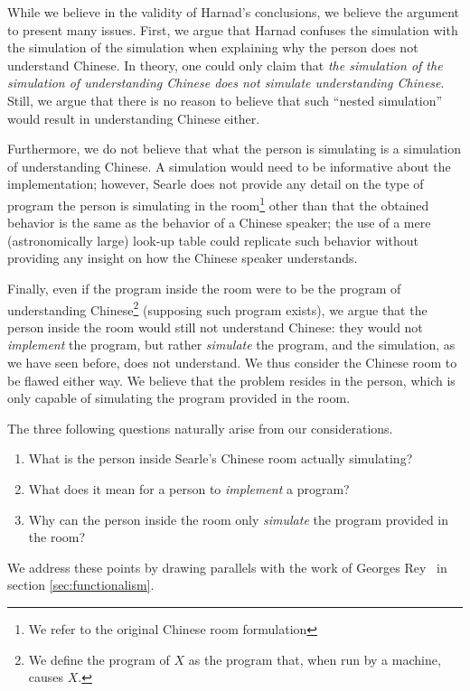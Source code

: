 While we believe in the validity of Harnad's conclusions, we believe the argument to present many issues. First, we argue that Harnad confuses the simulation with the simulation of the simulation when explaining why the person does not understand Chinese. In theory, one could only claim that \textit{the simulation of the simulation of understanding Chinese does not simulate understanding Chinese}. Still, we argue that there is no reason to believe that such ``nested simulation'' would result in understanding Chinese either.

Furthermore, we do not believe that what the person is simulating is a simulation of understanding Chinese. A simulation would need to be informative about the implementation; however, Searle does not provide any detail on the type of program the person is simulating in the room\footnote{We refer to the original Chinese room formulation} other than that the obtained behavior is the same as the behavior of a Chinese speaker; the use of a mere (astronomically large) look-up table could replicate such behavior without providing any insight on how the Chinese speaker understands.

Finally, even if the program inside the room were to be the program of understanding Chinese\footnote{We define the program of $X$ as the program that, when run by a machine, causes $X$.} (supposing such program exists), we argue that the person inside the room would still not understand Chinese: they would not \textit{implement} the program, but rather \textit{simulate} the program, and the simulation, as we have seen before, does not understand. We thus consider the Chinese room to be flawed either way. We believe that the problem resides in the person, which is only capable of simulating the program provided in the room.

The three following questions naturally arise from our considerations.
\begin{enumerate}
    \item What is the person inside Searle's Chinese room actually simulating?
    \item What does it mean for a person to \textit{implement} a program?
    \item Why can the person inside the room only \textit{simulate} the program provided in the room?
\end{enumerate}
We address these points by drawing parallels with the work of Georges Rey~\cite{rey1986s} in section \ref{sec:functionalism}.
